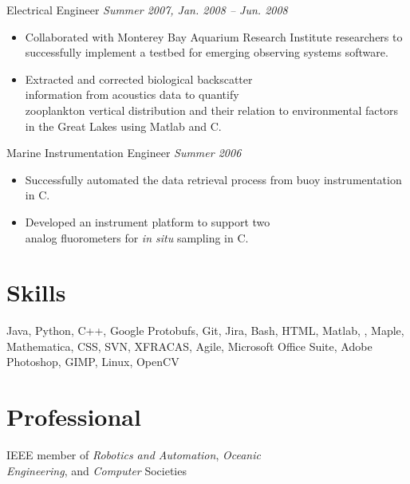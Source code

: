 \documentclass{article}
\begin{document}
{\begin{multicols}{2}
\begin{itemize}
    \end{itemize}
    \vspace{5px}
    Electrical Engineer  \hfill \textsl{Summer 2007, Jan. 2008 -- Jun. 2008}  \\
    \vspace{ -10px}	
    \begin{itemize}[noitemsep,nolistsep]
	\item Collaborated with Monterey Bay Aquarium Research Institute researchers to successfully implement a testbed for emerging observing systems software.
	\item Extracted and corrected biological backscatter \\information from acoustics data to quantify \\zooplankton vertical distribution and their relation to environmental factors in the Great Lakes using Matlab and C.
    \end{itemize}
    \vspace{5px}
    Marine Instrumentation Engineer \hfill \textsl{Summer 2006} \\
    \vspace{ -10px}	
    \begin{itemize}[noitemsep,nolistsep]
	\item Successfully automated the data retrieval process from buoy instrumentation in C. 
	\item Developed an instrument platform to support two \\analog fluorometers for \textit{in situ} sampling in C. 
    \end{itemize}
    \vspace{5px}
    \section*{Skills} 
    \noindent
    Java, Python, C++, Google Protobufs, Git, Jira, Bash, HTML, Matlab, \LaTeXe, Maple, Mathematica, CSS, SVN, XFRACAS, Agile, Microsoft Office Suite, Adobe Photoshop, GIMP, Linux, OpenCV
    \section*{Professional} 
    \noindent
    IEEE member of \textsl{Robotics and Automation}, \textsl{Oceanic \\Engineering}, and \textsl{Computer} Societies  
\end{multicols}
}
\end{document}
